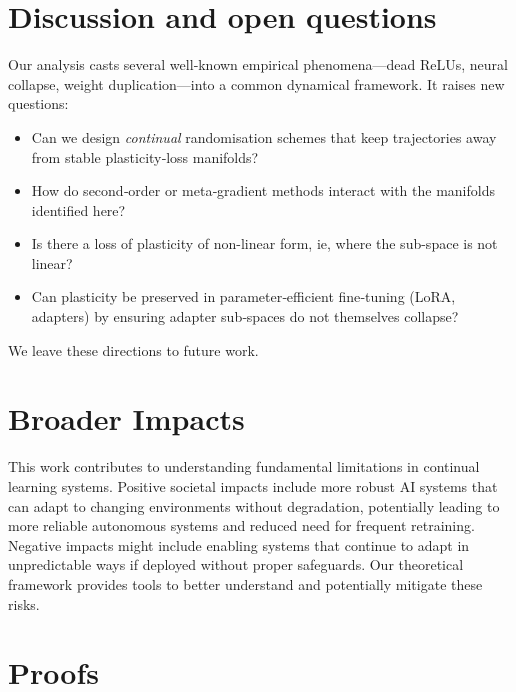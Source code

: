 \documentclass{article}
\begin{document}
\section{Discussion and open questions}
Our analysis casts several well‑known empirical phenomena—dead ReLUs, neural collapse, weight duplication—into a common dynamical framework. It raises new questions:
\begin{itemize}[nosep]
    \item Can we design \emph{continual} randomisation schemes that keep trajectories away from stable plasticity‑loss manifolds?
    \item How do second‑order or meta‑gradient methods interact with the manifolds identified here?
    \item Is there a loss of plasticity of non-linear form, ie, where the sub-space is not linear? 
    \item Can plasticity be preserved in parameter‑efficient fine‑tuning (LoRA, adapters) by ensuring adapter sub‑spaces do not themselves collapse?
\end{itemize}
We leave these directions to future work.

\section{Broader Impacts}
This work contributes to understanding fundamental limitations in continual learning systems. Positive societal impacts include more robust AI systems that can adapt to changing environments without degradation, potentially leading to more reliable autonomous systems and reduced need for frequent retraining. Negative impacts might include enabling systems that continue to adapt in unpredictable ways if deployed without proper safeguards. Our theoretical framework provides tools to better understand and potentially mitigate these risks.




\appendix 
\section{Proofs}
\label{app:proofs}
\end{document}
